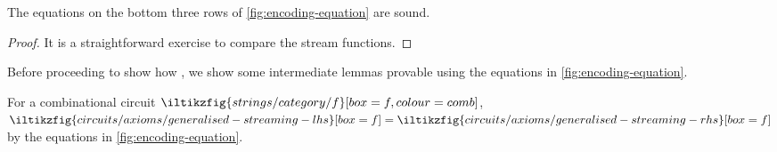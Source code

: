 \begin{lemma}
    The equations on the bottom three rows of \cref{fig:encoding-equation} are
    sound.
\end{lemma}
\begin{proof}
    It is a straightforward exercise to compare the stream functions.
\end{proof}

Before proceeding to show how , we show some intermediate lemmas provable using
the equations in \cref{fig:encoding-equation}.

\begin{lemma}\label{lem:generalised-streaming}
    For a combinational circuit \(
    \iltikzfig{strings/category/f}[box=f,colour=comb]
    \), \(
    \iltikzfig{circuits/axioms/generalised-streaming-lhs}[box=f]
    =
    \iltikzfig{circuits/axioms/generalised-streaming-rhs}[box=f]
    \) by the equations in \cref{fig:encoding-equation}.
\end{lemma}
